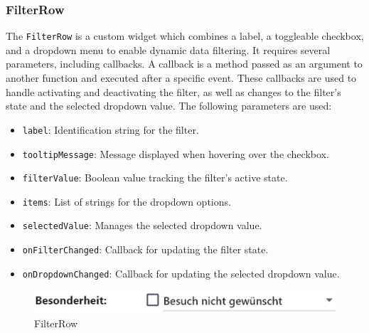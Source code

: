 \subsubsection{FilterRow}
\label{fig:FilterRow}

The \texttt{FilterRow} is a custom widget which combines a label, a toggleable checkbox, and a dropdown menu to enable dynamic data filtering. It requires several parameters, including callbacks. A callback is a method passed as an argument to another function and executed after a specific event. These callbacks are used to handle activating and deactivating the filter, as well as changes to the filter's state and the selected dropdown value. The following parameters are used:

\begin{itemize}
    \item \texttt{label}: Identification string for the filter.
    \item \texttt{tooltipMessage}: Message displayed when hovering over the checkbox.
    \item \texttt{filterValue}: Boolean value tracking the filter's active state.
    \item \texttt{items}: List of strings for the dropdown options.
    \item \texttt{selectedValue}: Manages the selected dropdown value.
    \item \texttt{onFilterChanged}: Callback for updating the filter state.
    \item \texttt{onDropdownChanged}: Callback for updating the selected dropdown value.
\end{itemize}


\begin{figure}[H]
    \centering
    \includegraphics[width=0.5\linewidth]{images/AdminPanel/FilterRow.png}
    \caption{FilterRow}
\end{figure}

\newpage

